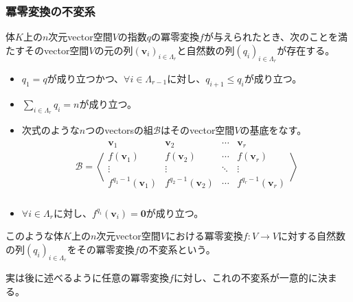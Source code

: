 \documentclass[dvipdfmx]{jsarticle}
\begin{document}
\subsubsection{冪零変換の不変系}%
\begin{thm}[冪零変換の不変系の存在性]\label{2.2.5.3}
体$K$上の$n$次元vector空間$V$の指数$q$の冪零変換$f$が与えられたとき、次のことを満たすそのvector空間$V$の元の列$\left( \mathbf{v}_{i} \right)_{i \in \varLambda_{r}}$と自然数の列$\left( q_{i} \right)_{i \in \varLambda_{r}}$が存在する。
\begin{itemize}
\item
  $q_{1} = q$が成り立つかつ、$\forall i \in \varLambda_{r - 1}$に対し、$q_{i + 1} \leq q_{i}$が成り立つ。
\item
  $\sum_{i \in \varLambda_{r}} q_{i} = n$が成り立つ。
\item
  次式のような$n$つのvectorsの組$\mathcal{B}$はそのvector空間$V$の基底をなす。
\begin{align*}
\mathcal{B} =\left\langle \begin{matrix}
\mathbf{v}_{1} & \mathbf{v}_{2} & \cdots & \mathbf{v}_{r} \\
f\left( \mathbf{v}_{1} \right) & f\left( \mathbf{v}_{2} \right) & \cdots & f\left( \mathbf{v}_{r} \right) \\
 \vdots & \vdots & \ddots & \vdots \\
f^{q_{1} - 1}\left( \mathbf{v}_{1} \right) & f^{q_{2} - 1}\left( \mathbf{v}_{2} \right) & \cdots & f^{q_{r} - 1}\left( \mathbf{v}_{r} \right) \\
\end{matrix} \right\rangle
\end{align*}
\item
  $\forall i \in \varLambda_{r}$に対し、$f^{q_{i}}\left( \mathbf{v}_{i} \right) = \mathbf{0}$が成り立つ。
\end{itemize}
\end{thm}
\begin{dfn}
このような体$K$上の$n$次元vector空間$V$における冪零変換$f:V \rightarrow V$に対する自然数の列$\left( q_{i} \right)_{i \in \varLambda_{r}}$をその冪零変換$f$の不変系という。
\end{dfn}\par
実は後に述べるように任意の冪零変換$f$に対し、これの不変系が一意的に決まる。
\end{document}
